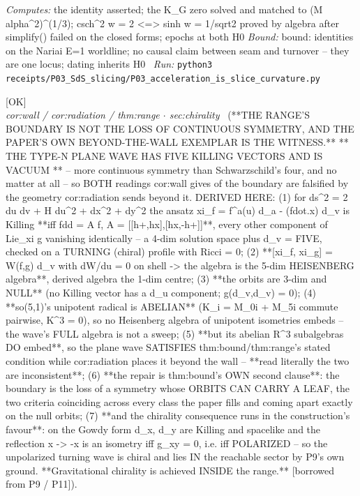\begin{description}
\emph{Computes:} the identity asserted; the K\_G zero solved and matched to (M alpha\textasciicircum{}2)\textasciicircum{}(1/3); csch\textasciicircum{}2 w = 2 <=> sinh w = 1/sqrt2 proved by algebra after simplify() failed on the closed forms; epochs at both H0
 \emph{Bound:} bound: identities on the Nariai E=1 worldline; no causal claim between seam and turnover -- they are one locus; dating inherits H0
\ \emph{Run:} \texttt{python3 receipts/P03\_SdS\_slicing/P03\_acceleration\_is\_slice\_curvature.py}
\item[\rcptlabel{P09_the_wall_is_not_the_loss_of_symmetry}{P9R9}\textbf{P9R9}\quad\texttt{P09\_the\_wall\_is\_not\_the\_loss\_of\_symmetry}]\hfill\textsf{[OK]}\\
\textit{cor:wall / cor:radiation / thm:range \ensuremath{\cdot} sec:chirality} \ (**THE RANGE'S BOUNDARY IS NOT THE LOSS OF CONTINUOUS SYMMETRY, AND THE PAPER'S OWN BEYOND-THE-WALL EXEMPLAR IS THE WITNESS.** ** THE TYPE-N PLANE WAVE HAS FIVE KILLING VECTORS AND IS VACUUM ** -- more continuous symmetry than Schwarzschild's four, and no matter at all -- so BOTH readings cor:wall gives of the boundary are falsified by the geometry cor:radiation sends beyond it. DERIVED HERE: (1) for ds\textasciicircum{}2 = 2 du dv + H du\textasciicircum{}2 + dx\textasciicircum{}2 + dy\textasciicircum{}2 the ansatz xi\_f = f\textasciicircum{}a(u) d\_a - (fdot.x) d\_v is Killing **iff fdd = A f, A = [[h+,hx],[hx,-h+]]**, every other component of Lie\_xi g vanishing identically -- a 4-dim solution space plus d\_v = FIVE, checked on a TURNING (chiral) profile with Ricci = 0; (2) **[xi\_f, xi\_g] = W(f,g) d\_v with dW/du = 0 on shell -> the algebra is the 5-dim HEISENBERG algebra**, derived algebra the 1-dim centre; (3) **the orbits are 3-dim and NULL** (no Killing vector has a d\_u component; g(d\_v,d\_v) = 0); (4) **so(5,1)'s unipotent radical is ABELIAN** (K\_i = M\_0i + M\_5i commute pairwise, K\textasciicircum{}3 = 0), so no Heisenberg algebra of unipotent isometries embeds -- the wave's FULL algebra is not a sweep; (5) **but its abelian R\textasciicircum{}3 subalgebras DO embed**, so the plane wave SATISFIES thm:bound/thm:range's stated condition while cor:radiation places it beyond the wall -- **read literally the two are inconsistent**; (6) **the repair is thm:bound's OWN second clause**: the boundary is the loss of a symmetry whose ORBITS CAN CARRY A LEAF, the two criteria coinciding across every class the paper fills and coming apart exactly on the null orbits; (7) **and the chirality consequence runs in the construction's favour**: on the Gowdy form d\_x, d\_y are Killing and spacelike and the reflection x -> -x is an isometry iff g\_xy = 0, i.e. iff POLARIZED -- so the unpolarized turning wave is chiral and lies IN the reachable sector by P9's own ground. **Gravitational chirality is achieved INSIDE the range.** [borrowed from P9 / P11]). 

\end{description}
